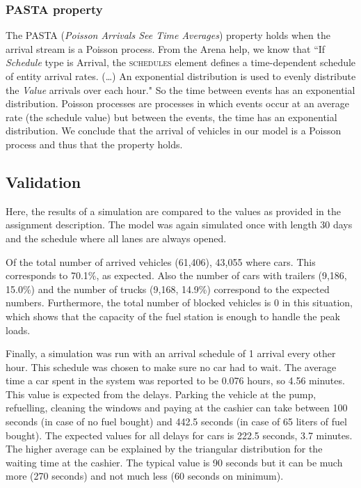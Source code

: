 \subsubsection{PASTA property}
The PASTA (\textit{Poisson Arrivals See Time Averages}) property holds when the arrival stream is a Poisson process.
From the Arena help, we know that ``If \textit{Schedule} type is Arrival, the \textsc{schedules} element defines a time-dependent schedule of entity arrival rates. (\ldots)
An exponential distribution is used to evenly distribute the \textit{Value} arrivals over each hour."
So the time between events has an exponential distribution.
Poisson processes are processes in which events occur at an average rate (the schedule value) but between the events, the time has an exponential distribution.
We conclude that the arrival of vehicles in our model is a Poisson process and thus that the property holds.

\subsection{Validation}
Here, the results of a simulation are compared to the values as provided in the assignment description.
The model was again simulated once with length 30 days and the schedule where all lanes are always opened.

Of the total number of arrived vehicles (61,406), 43,055 where cars. 
This corresponds to 70.1\%, as expected.
Also the number of cars with trailers (9,186, 15.0\%) and the number of trucks (9,168, 14.9\%) correspond to the expected numbers.
Furthermore, the total number of blocked vehicles is 0 in this situation, which shows that the capacity of the fuel station is enough to handle the peak loads.

Finally, a simulation was run with an arrival schedule of 1 arrival every other hour.
This schedule was chosen to make sure no car had to wait.
The average time a car spent in the system was reported to be 0.076 hours, so 4.56 minutes. 
This value is expected from the delays.
Parking the vehicle at the pump, refuelling, cleaning the windows and paying at the cashier can take between 100 seconds (in case of no fuel bought) and 442.5 seconds (in case of 65 liters of fuel bought). 
The expected values for all delays for cars is 222.5 seconds, 3.7 minutes.
The higher average can be explained by the triangular distribution for the waiting time at the cashier. 
The typical value is 90 seconds but it can be much more (270 seconds) and not much less (60 seconds on minimum). 





